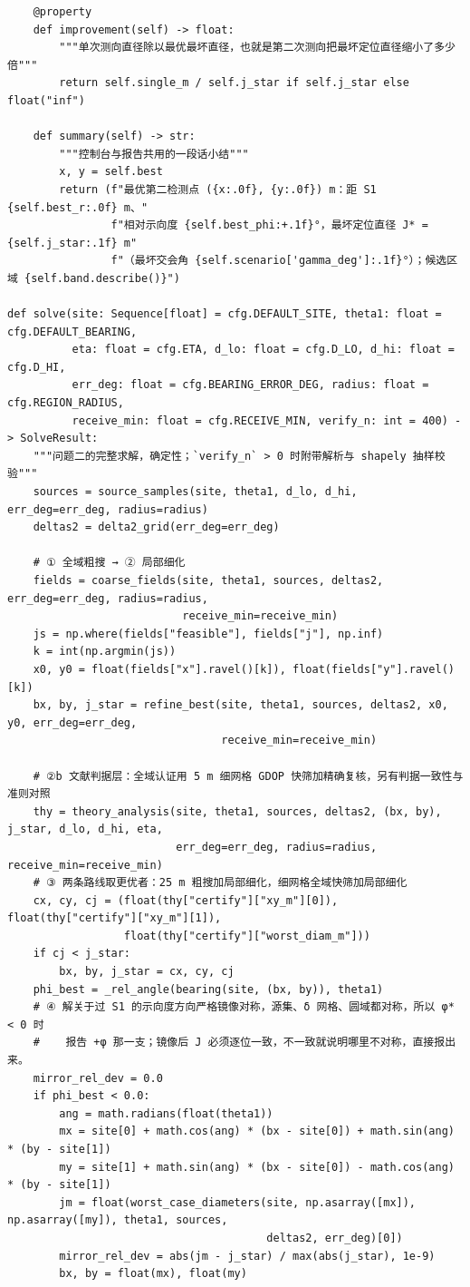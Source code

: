 \documentclass[UTF8, zihao=5,AutoFakeBold=2]{ctexart}
\begin{document}
\begin{lstlisting}
    @property
    def improvement(self) -> float:
        """单次测向直径除以最优最坏直径，也就是第二次测向把最坏定位直径缩小了多少倍"""
        return self.single_m / self.j_star if self.j_star else float("inf")

    def summary(self) -> str:
        """控制台与报告共用的一段话小结"""
        x, y = self.best
        return (f"最优第二检测点 ({x:.0f}, {y:.0f}) m：距 S1 {self.best_r:.0f} m、"
                f"相对示向度 {self.best_phi:+.1f}°，最坏定位直径 J* = {self.j_star:.1f} m"
                f"（最坏交会角 {self.scenario['gamma_deg']:.1f}°）；候选区域 {self.band.describe()}")

def solve(site: Sequence[float] = cfg.DEFAULT_SITE, theta1: float = cfg.DEFAULT_BEARING,
          eta: float = cfg.ETA, d_lo: float = cfg.D_LO, d_hi: float = cfg.D_HI,
          err_deg: float = cfg.BEARING_ERROR_DEG, radius: float = cfg.REGION_RADIUS,
          receive_min: float = cfg.RECEIVE_MIN, verify_n: int = 400) -> SolveResult:
    """问题二的完整求解，确定性；`verify_n` > 0 时附带解析与 shapely 抽样校验"""
    sources = source_samples(site, theta1, d_lo, d_hi, err_deg=err_deg, radius=radius)
    deltas2 = delta2_grid(err_deg=err_deg)

    # ① 全域粗搜 → ② 局部细化
    fields = coarse_fields(site, theta1, sources, deltas2, err_deg=err_deg, radius=radius,
                           receive_min=receive_min)
    js = np.where(fields["feasible"], fields["j"], np.inf)
    k = int(np.argmin(js))
    x0, y0 = float(fields["x"].ravel()[k]), float(fields["y"].ravel()[k])
    bx, by, j_star = refine_best(site, theta1, sources, deltas2, x0, y0, err_deg=err_deg,
                                 receive_min=receive_min)

    # ②b 文献判据层：全域认证用 5 m 细网格 GDOP 快筛加精确复核，另有判据一致性与准则对照
    thy = theory_analysis(site, theta1, sources, deltas2, (bx, by), j_star, d_lo, d_hi, eta,
                          err_deg=err_deg, radius=radius, receive_min=receive_min)
    # ③ 两条路线取更优者：25 m 粗搜加局部细化，细网格全域快筛加局部细化
    cx, cy, cj = (float(thy["certify"]["xy_m"][0]), float(thy["certify"]["xy_m"][1]),
                  float(thy["certify"]["worst_diam_m"]))
    if cj < j_star:
        bx, by, j_star = cx, cy, cj
    phi_best = _rel_angle(bearing(site, (bx, by)), theta1)
    # ④ 解关于过 S1 的示向度方向严格镜像对称，源集、δ 网格、圆域都对称，所以 φ* < 0 时
    #    报告 +φ 那一支；镜像后 J 必须逐位一致，不一致就说明哪里不对称，直接报出来。
    mirror_rel_dev = 0.0
    if phi_best < 0.0:
        ang = math.radians(float(theta1))
        mx = site[0] + math.cos(ang) * (bx - site[0]) + math.sin(ang) * (by - site[1])
        my = site[1] + math.sin(ang) * (bx - site[0]) - math.cos(ang) * (by - site[1])
        jm = float(worst_case_diameters(site, np.asarray([mx]), np.asarray([my]), theta1, sources,
                                        deltas2, err_deg)[0])
        mirror_rel_dev = abs(jm - j_star) / max(abs(j_star), 1e-9)
        bx, by = float(mx), float(my)


\end{lstlisting}
\end{document}
